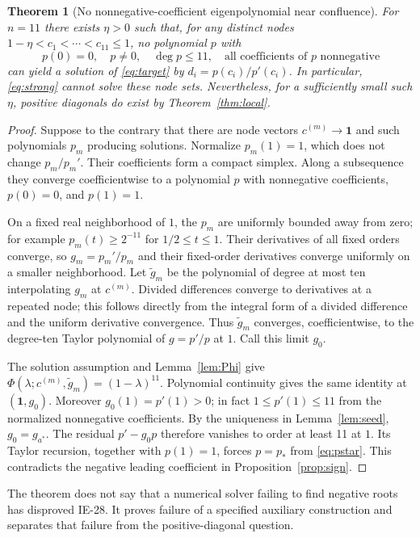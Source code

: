 \documentclass[11pt]{article}
\newtheorem{theorem}{Theorem}[section]
\theoremstyle{remark}\newtheorem{remark}[theorem]{Remark}
\begin{document}
\begin{theorem}[No nonnegative-coefficient eigenpolynomial near confluence]\label{thm:obstruction}
For $n=11$ there exists $\eta>0$ such that, for any distinct nodes
$1-\eta<c_1<\cdots<c_{11}\le1$, no polynomial $p$ with
\[
 p(0)=0,\quad p\ne0,\quad \deg p\le11,
 \quad\text{all coefficients of $p$ nonnegative}
\]
can yield a solution of \eqref{eq:target} by $d_i=p(c_i)/p'(c_i)$.
In particular, \eqref{eq:strong} cannot solve these node sets. Nevertheless,
for a sufficiently small such $\eta$, positive diagonals \emph{do} exist by
Theorem~\ref{thm:local}.
\end{theorem}
\begin{proof}
Suppose to the contrary that there are node vectors $c^{(m)}\to\mathbf1$ and
such polynomials $p_m$ producing solutions. Normalize $p_m(1)=1$, which does
not change $p_m/p_m'$. Their coefficients form a compact simplex. Along a
subsequence they converge coefficientwise to a polynomial $p$ with
nonnegative coefficients, $p(0)=0$, and $p(1)=1$.

On a fixed real neighborhood of $1$, the $p_m$ are uniformly bounded away
from zero; for example $p_m(t)\ge2^{-11}$ for $1/2\le t\le1$.
Their derivatives of all fixed orders converge, so $g_m=p_m'/p_m$ and their
fixed-order derivatives converge uniformly on a smaller neighborhood.
Let $\widetilde g_m$ be the polynomial of degree at most ten interpolating
$g_m$ at $c^{(m)}$. Divided differences converge to derivatives at a repeated
node; this follows directly from the integral form of a divided difference
and the uniform derivative convergence. Thus $\widetilde g_m$ converges,
coefficientwise, to the degree-ten Taylor polynomial of $g=p'/p$ at $1$.
Call this limit $g_0$.

The solution assumption and Lemma~\ref{lem:Phi} give
$\Phi(\lambda;c^{(m)},\widetilde g_m)=(1-\lambda)^{11}$.
Polynomial continuity gives the same identity at $(\mathbf1,g_0)$.
Moreover $g_0(1)=p'(1)>0$; in fact $1\le p'(1)\le11$ from the normalized
nonnegative coefficients. By the uniqueness in Lemma~\ref{lem:seed},
$g_0=g_{a^*}$. The residual $p'-g_0p$ therefore vanishes to order at least
11 at $1$. Its Taylor recursion, together with $p(1)=1$, forces
$p=p_*$ from \eqref{eq:pstar}. This contradicts the negative leading
coefficient in Proposition~\ref{prop:sign}.
\end{proof}

The theorem does not say that a numerical solver failing to find negative
roots has disproved IE-28. It proves failure of a specified auxiliary
construction and separates that failure from the positive-diagonal question.
\end{document}
